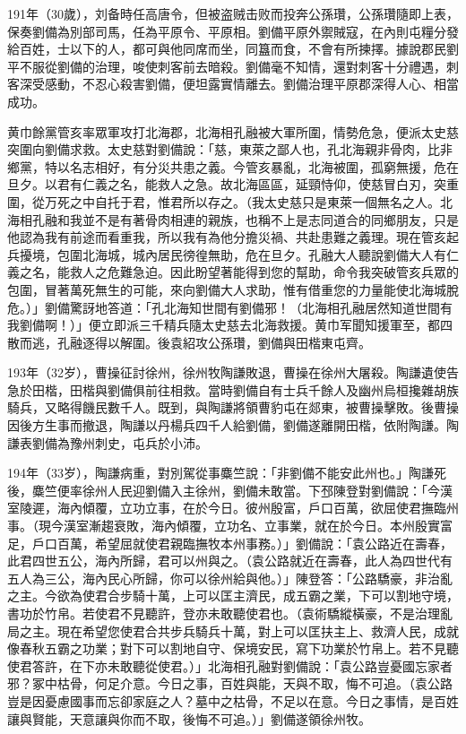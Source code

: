191年（30歲），刘备時任高唐令，但被盗贼击败而投奔公孫瓚，公孫瓚隨即上表，保奏劉備為別部司馬，任為平原令、平原相。劉備平原外禦賊寇，在內則屯糧分發給百姓，士以下的人，都可與他同席而坐，同簋而食，不會有所揀擇。據說郡民劉平不服從劉備的治理，唆使刺客前去暗殺。劉備毫不知情，還對刺客十分禮遇，刺客深受感動，不忍心殺害劉備，便坦露實情離去。劉備治理平原郡深得人心、相當成功。

黄巾餘黨管亥率眾軍攻打北海郡，北海相孔融被大軍所圍，情勢危急，便派太史慈突圍向劉備求救。太史慈對劉備說：「慈，東萊之鄙人也，孔北海親非骨肉，比非鄉黨，特以名志相好，有分災共患之義。今管亥暴亂，北海被圍，孤窮無援，危在旦夕。以君有仁義之名，能救人之急。故北海區區，延頸恃仰，使慈冒白刃，突重圍，從万死之中自托于君，惟君所以存之。（我太史慈只是東萊一個無名之人。北海相孔融和我並不是有著骨肉相連的親族，也稱不上是志同道合的同鄉朋友，只是他認為我有前途而看重我，所以我有為他分擔災禍、共赴患難之義理。現在管亥起兵擾境，包圍北海城，城內居民徬徨無助，危在旦夕。孔融大人聽說劉備大人有仁義之名，能救人之危難急迫。因此盼望著能得到您的幫助，命令我突破管亥兵眾的包圍，冒著萬死無生的可能，來向劉備大人求助，惟有借重您的力量能使北海城脫危。）」劉備驚訝地答道：「孔北海知世間有劉備邪！（北海相孔融居然知道世間有我劉備啊！）」便立即派三千精兵隨太史慈去北海救援。黄巾军聞知援軍至，都四散而逃，孔融逐得以解圍。後袁紹攻公孫瓚，劉備與田楷東屯齊。

193年（32岁），曹操征討徐州，徐州牧陶謙敗退，曹操在徐州大屠殺。陶謙遺使告急於田楷，田楷與劉備俱前往相救。當時劉備自有士兵千餘人及幽州烏桓攙雜胡族騎兵，又略得饑民數千人。既到，與陶謙將領曹豹屯在郯東，被曹操擊敗。後曹操因後方生事而撤退，陶謙以丹楊兵四千人給劉備，劉備遂離開田楷，依附陶謙。陶謙表劉備為豫州刺史，屯兵於小沛。

194年（33岁），陶謙病重，對別駕從事麋竺說：「非劉備不能安此州也。」陶謙死後，麋竺便率徐州人民迎劉備入主徐州，劉備未敢當。下邳陳登對劉備說：「今漢室陵遲，海內傾覆，立功立事，在於今日。彼州殷富，戶口百萬，欲屈使君撫臨州事。（現今漢室漸趨衰敗，海內傾覆，立功名、立事業，就在於今日。本州殷實富足，戶口百萬，希望屈就使君親臨撫牧本州事務。）」劉備說：「袁公路近在壽春，此君四世五公，海內所歸，君可以州與之。（袁公路就近在壽春，此人為四世代有五人為三公，海內民心所歸，你可以徐州給與他。）」陳登答：「公路驕豪，非治亂之主。今欲為使君合步騎十萬，上可以匡主濟民，成五霸之業，下可以割地守境，書功於竹帛。若使君不見聽許，登亦未敢聽使君也。（袁術驕縱橫豪，不是治理亂局之主。現在希望您使君合共步兵騎兵十萬，對上可以匡扶主上、救濟人民，成就像春秋五霸之功業；對下可以割地自守、保境安民，寫下功業於竹帛上。若不見聽使君答許，在下亦未敢聽從使君。）」北海相孔融對劉備說：「袁公路豈憂國忘家者邪？冢中枯骨，何足介意。今日之事，百姓與能，天與不取，悔不可追。（袁公路豈是因憂慮國事而忘卻家庭之人？墓中之枯骨，不足以在意。今日之事情，是百姓讓與賢能，天意讓與你而不取，後悔不可追。）」劉備遂領徐州牧。

